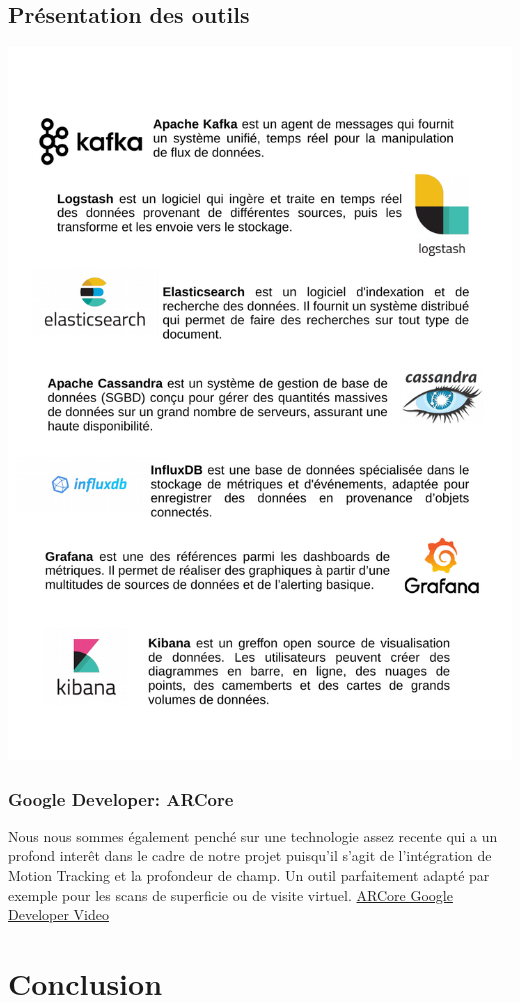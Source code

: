 \documentclass[12pt]{report}
\begin{document}
\section{Présentation des outils}
\includegraphics[width=16cm]{pdfinc/Outils.pdf}
\subsection{Google Developer: ARCore}
Nous nous sommes également penché sur une technologie assez recente qui a un profond interêt dans le cadre de notre projet puisqu'il
s'agit de l'intégration de Motion Tracking et la profondeur de champ. Un outil parfaitement adapté par exemple pour les scans de superficie
ou de visite virtuel.
\href{https://www.youtube.com/watch?v=NhJydpMkpug}{ARCore Google Developer Video}


\chapter{Conclusion}
\end{document}
